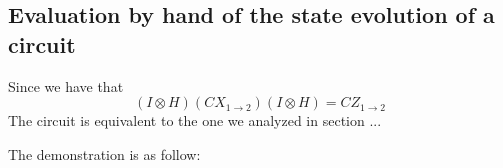 \begin{figure}[h]
    \centering

\end{figure}


\subsection{Evaluation by hand of the state evolution of a circuit}
Since we have that
\begin{equation}
    (I \otimes H) (CX_{1 \to 2}) ( I \otimes H) = CZ_{1 \to 2}
\end{equation}
The circuit is equivalent to the one we analyzed in section ... 

The demonstration is as follow:



